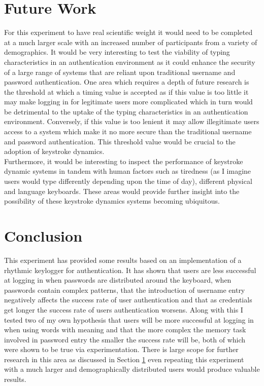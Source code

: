 \documentclass{article}
\begin{document}
\section{Future Work} \label{futureWork}
For this experiment to have real scientific weight it would need to be completed at a much larger scale with an increased number of participants from a variety of demographics. It would be very interesting to test the viability of typing characteristics in an authentication environment as it could enhance the security of a large range of systems that are reliant upon traditional username and password authentication. One area which requires a depth of future research is the threshold at which a timing value is accepted as if this value is too little it may make logging in for legitimate users more complicated which in turn would be detrimental to the uptake of the typing characteristics in an authentication environment. Conversely, if this value is too lenient it may allow illegitimate users access to a system which make it no more secure than the traditional username and password authentication. This threshold value would be crucial to the adoption of keystroke dynamics.  \\

Furthermore, it would be interesting to inspect the performance of keystroke dynamic systems in tandem with human factors such as tiredness (as I imagine users would type differently depending upon the time of day), different physical and language keyboards. These areas would provide further insight into the possibility of these keystroke dynamics systems becoming ubiquitous.   

\section{Conclusion}
This experiment has provided some results based on an implementation of a rhythmic keylogger for authentication. It has shown that users are less successful at logging in when passwords are distributed around the keyboard, when passwords contain complex patterns, that the introduction of username entry negatively affects the success rate of user authentication and that as credentials get longer the success rate of users authentication worsens. Along with this I tested two of my own hypothesis that users will be more successful at logging in when using words with meaning and that the more complex the memory task involved in password entry the smaller the success rate will be, both of which were shown to be true via experimentation. There is large scope for further research in this area as discussed in Section \ref{futureWork} even repeating this experiment with a much larger and demographically distributed users would produce valuable results.  \\
\end{document}
